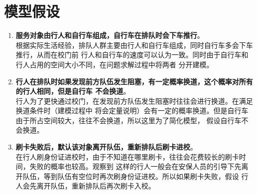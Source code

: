 \section{模型假设}
\begin{enumerate}
    \setlength{\leftskip}{0pt}
    \item \textbf{服务对象由行人和自行车组成，自行车在排队时会下车推行}。
    \\ 根据实际生活经验，排队人群主要由行人和自行车组成，同时自行车多会下车推行，从而在校门前
    行人和自行车的速度可以认为一致。同时由于自行车和行人占用的空间大小不同，在问题求解过程中将两者
    分开建模。
    \item \textbf{行人在排队时如果发现前方队伍发生阻塞，有一定概率换道，这个概率对所有的行人相同，但是自行车
    不会换道}。
    \\ 行人为了更快通过校门，在发现前方队伍发生阻塞时往往会进行换道。在满足换道条件时（建模过程中
    将会定量说明）会有一定的概率换道。但是自行车由于所占空间较大，往往不会换道，所以这里为了简化模型，
    假设自行车不会换道。
    \item \textbf{刷卡失败后，默认该对象离开队伍，重新排队后刷卡进校}。
    \\ 在行人刷身份证进校时，由于不知道在哪里刷卡，往往会花费较长的刷卡时间，失败的概率也较高。观察到
    这样的行人一般会在安保人员的引导下先离开队伍，等到队伍有空位时再次刷身份证进校。所以如果刷卡失败，假设
    行人会先离开队伍，重新排队后再次刷卡入校。
\end{enumerate}